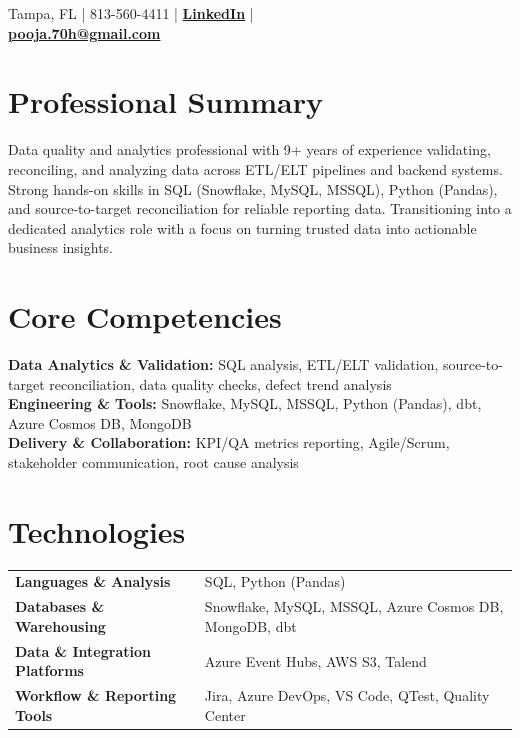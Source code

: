 \documentclass[10pt,letterpaper]{article}
\begin{document}
\pagestyle{empty}
\small

 \hfill Tampa, FL | 813-560-4411 | \href{https://www.linkedin.com/}{\textbf{LinkedIn}} |
\\
 \hfill \href{mailto:pooja.70h@gmail.com}{\textbf{pooja.70h@gmail.com}}

\section*{Professional Summary}
Data quality and analytics professional with 9+ years of experience validating, reconciling, and analyzing data across ETL/ELT pipelines and backend systems. Strong hands-on skills in SQL (Snowflake, MySQL, MSSQL), Python (Pandas), and source-to-target reconciliation for reliable reporting data. Transitioning into a dedicated analytics role with a focus on turning trusted data into actionable business insights.

\section*{Core Competencies}
\textbf{Data Analytics \& Validation:} SQL analysis, ETL/ELT validation, source-to-target reconciliation, data quality checks, defect trend analysis \\
\textbf{Engineering \& Tools:} Snowflake, MySQL, MSSQL, Python (Pandas), dbt, Azure Cosmos DB, MongoDB \\
\textbf{Delivery \& Collaboration:} KPI/QA metrics reporting, Agile/Scrum, stakeholder communication, root cause analysis

\section*{Technologies}
\begin{tabularx}{\textwidth}{>{\bfseries}p{} X}
Languages \& Analysis & SQL, Python (Pandas) \\
Databases \& Warehousing & Snowflake, MySQL, MSSQL, Azure Cosmos DB, MongoDB, dbt \\
Data \& Integration Platforms & Azure Event Hubs, AWS S3, Talend \\
Workflow \& Reporting Tools & Jira, Azure DevOps, VS Code, QTest, Quality Center \\
\end{tabularx}
\end{document}
